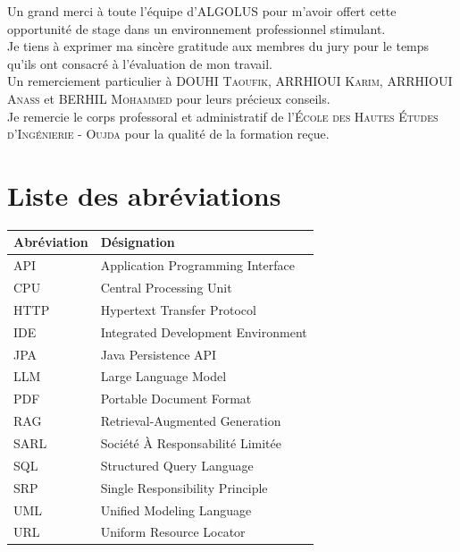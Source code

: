 \documentclass[12pt,a4paper]{report}
\begin{document}
	Un grand merci à toute l'équipe d'\textsc{ALGOLUS} pour m'avoir offert cette opportunité de stage dans un environnement professionnel stimulant.\\[0.6em]
	
	Je tiens à exprimer ma sincère gratitude aux membres du jury pour le temps qu’ils ont consacré à l’évaluation de mon travail.\\[0.6em]
	
	Un remerciement particulier à \textsc{DOUHI Taoufik}, \textsc{ARRHIOUI Karim}, \textsc{ARRHIOUI Anass} et \textsc{BERHIL Mohammed} pour leurs précieux conseils.\\[0.6em]
			
	Je remercie le corps professoral et administratif de l'\textsc{École des Hautes Études d'Ingénierie - Oujda} pour la qualité de la formation reçue.
	
	\clearpage
	\chapter*{Liste des abréviations}
	
	\begin{table}[H]
		\centering
		\begin{tabular}{|l|l|}
			\hline
			\textbf{Abréviation} & \textbf{Désignation} \\
			\hline
			API & Application Programming Interface \\
			\hline
			CPU & Central Processing Unit \\
			\hline
			HTTP & Hypertext Transfer Protocol \\
			\hline
			IDE & Integrated Development Environment \\
			\hline
			JPA & Java Persistence API \\
			\hline
			LLM & Large Language Model \\
			\hline
			PDF & Portable Document Format \\
			\hline
			RAG & Retrieval-Augmented Generation \\
			\hline
			SARL & Société À Responsabilité Limitée \\
			\hline
			SQL & Structured Query Language \\
			\hline
			SRP & Single Responsibility Principle \\
			\hline
			UML & Unified Modeling Language \\
			\hline
			URL & Uniform Resource Locator \\
			\hline
		\end{tabular}
		\label{tab:liste-abréviations}
	\end{table}
	
\end{document}
